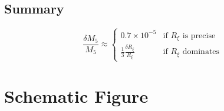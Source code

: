 \documentclass[11pt,a4paper]{article}
\newcommand{\Mfive}{M_5}
\newcommand{\Rxi}{R_\xi}
\begin{document}
\subsection{Summary}

\begin{equation}
\boxed{
\frac{\delta \Mfive}{\Mfive} \approx
\begin{cases}
0.7 \times 10^{-5} & \text{if } \Rxi \text{ is precise} \\[0.5em]
\frac{1}{3} \frac{\delta \Rxi}{\Rxi} & \text{if } \Rxi \text{ dominates}
\end{cases}
}
\end{equation}

\section{Schematic Figure}
\label{sec:figure}
\end{document}
